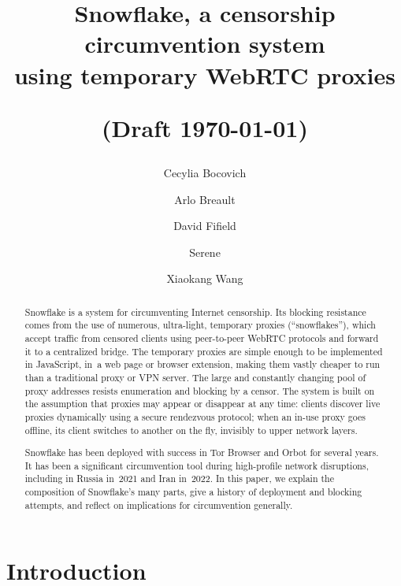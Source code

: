 \documentclass[letterpaper,twocolumn]{article}
\begin{document}
\date{}

\title{Snowflake, a censorship circumvention system\\using temporary WebRTC proxies\\\strut\large (Draft \today)}

\author{%
Cecylia Bocovich%
\and
Arlo Breault%
\and
David Fifield%
\and
Serene%
\and
Xiaokang Wang%
}
\renewcommand{\maketitlehookc}{\centering\normalsize Authors are listed alphabetically.}

\maketitle

\begin{abstract}
Snowflake is a system for circumventing Internet censorship.
Its blocking resistance comes from
the use of numerous, ultra-light, temporary proxies (``snowflakes''),
which accept traffic from censored clients using peer-to-peer WebRTC protocols
and forward it to a centralized bridge.
The temporary proxies are simple enough to be implemented in JavaScript,
in~a web page or browser extension,
making them vastly cheaper to run than
a traditional proxy or VPN server.
The large and constantly changing pool
of proxy addresses resists enumeration and blocking by a censor.
The system is built on the assumption
that proxies may appear or disappear at any time:
clients discover live proxies dynamically
using a secure rendezvous protocol;
when an \mbox{in-use} proxy goes offline,
its client switches to another on the fly,
invisibly to upper network layers.

Snowflake has been deployed with success
in Tor Browser and Orbot for several years.
It has been a significant circumvention tool
during high-profile network disruptions,
including in Russia in~2021 and Iran in~2022.
In this paper, we explain the composition of Snowflake's many parts,
give a history of deployment and blocking attempts,
and reflect on implications for circumvention generally.
\end{abstract}


\section{Introduction}
\label{sec:intro}
\end{document}

